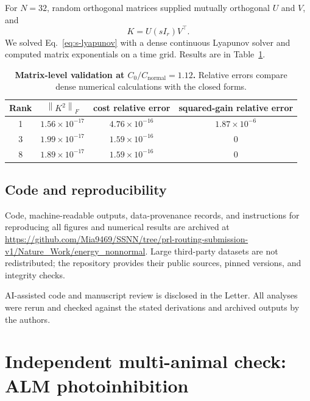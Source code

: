 \documentclass[
  aps,prl,preprint,notitlepage,superscriptaddress,nofootinbib,longbibliography,
  amsmath,amssymb
]{revtex4-2}
\newcommand{\frobnorm}[1]{\left\lVert #1\right\rVert_F}
\begin{document}
For $N=32$, random orthogonal matrices supplied mutually orthogonal $U$ and
$V$, and
\begin{equation}
K=U(sI_r)V^\top.
\end{equation}
We solved Eq.~\eqref{eq:s-lyapunov} with a dense continuous Lyapunov solver and
computed matrix exponentials on a time grid. Results are in
Table~\ref{tab:s-validation}.

\begin{table}[t]
\caption{\textbf{Matrix-level validation at
$C_0/C_{\mathrm{normal}}=1.12$.}
Relative errors compare dense numerical calculations with the closed forms.}
\label{tab:s-validation}
\begin{ruledtabular}
\begin{tabular}{cccc}
Rank & $\frobnorm{K^2}$ & cost relative error & squared-gain relative error\\
\midrule
1 & $1.56\times10^{-17}$ & $4.76\times10^{-16}$ & $1.87\times10^{-6}$\\
3 & $1.99\times10^{-17}$ & $1.59\times10^{-16}$ & $0$\\
8 & $1.89\times10^{-17}$ & $1.59\times10^{-16}$ & $0$\\
\end{tabular}
\end{ruledtabular}
\end{table}

\subsection{Code and reproducibility}

Code, machine-readable outputs, data-provenance records, and instructions for
reproducing all figures and numerical results are archived at
\url{https://github.com/Mia9469/SSNN/tree/prl-routing-submission-v1/Nature_Work/energy_nonnormal}.
Large third-party datasets are not redistributed; the repository provides their
public sources, pinned versions, and integrity checks.

AI-assisted code and manuscript review is disclosed in the Letter.  All
analyses were rerun and checked against the stated derivations and archived
outputs by the authors.


\section{Independent multi-animal check: ALM photoinhibition}
\label{sec:s-alm}
\end{document}
